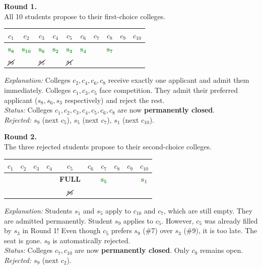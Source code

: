 {\medskip
\noindent\textbf{Round 1.} \\
All 10 students propose to their first-choice colleges.
\begin{center}
\renewcommand{\arraystretch}{1.2}
\begin{tabular}{cccccccccc}
    $c_1$ & $c_2$ & $c_3$ & $c_4$ & $c_5$ & $c_6$ & $c_7$ & $c_8$ & $c_9$ & $c_{10}$ \\
    \hline
    \textcolor{ForestGreen}{$\mathbf{s_8}$} & \textcolor{ForestGreen}{$\mathbf{s_{10}}$} & \textcolor{ForestGreen}{$\mathbf{s_6}$} & \textcolor{ForestGreen}{$\mathbf{s_2}$} & \textcolor{ForestGreen}{$\mathbf{s_3}$} & \textcolor{ForestGreen}{$\mathbf{s_4}$} & & \textcolor{ForestGreen}{$\mathbf{s_7}$} & & \\
    $\cancel{s_9}$ & & $\cancel{s_5}$ & & $\cancel{s_1}$ & & & & & \\
\end{tabular}
\end{center}
\textit{Explanation:} Colleges $c_2, c_4, c_6, c_8$ receive exactly one applicant and admit them immediately. Colleges $c_1, c_3, c_5$ face competition. They admit their preferred applicant ($s_8, s_6, s_3$ respectively) and reject the rest. \\
\textit{Status:} Colleges $c_1, c_2, c_3, c_4, c_5, c_6, c_8$ are now \textbf{permanently closed}. \\
\textit{Rejected:} $s_9$ (next $c_5$), $s_5$ (next $c_7$), $s_1$ (next $c_{10}$).

\medskip
\noindent\textbf{Round 2.} \\
The three rejected students propose to their second-choice colleges. 
\begin{center}
\renewcommand{\arraystretch}{1.2}
\begin{tabular}{cccccccccc}
    \cellcolor{gray!20}$c_1$ & \cellcolor{gray!20}$c_2$ & \cellcolor{gray!20}$c_3$ & \cellcolor{gray!20}$c_4$ & \cellcolor{gray!20}$c_5$ & \cellcolor{gray!20}$c_6$ & $c_7$ & \cellcolor{gray!20}$c_8$ & $c_9$ & $c_{10}$ \\
    \hline
    & & & & \textbf{FULL} & & \textcolor{ForestGreen}{$\mathbf{s_5}$} & & & \textcolor{ForestGreen}{$\mathbf{s_1}$} \\
    & & & & $\cancel{s_9}$ & & & & & \\
\end{tabular}
\end{center}
\textit{Explanation:} Students $s_1$ and $s_5$ apply to $c_{10}$ and $c_7$, which are still empty. They are admitted permanently. Student $s_9$ applies to $c_5$. However, $c_5$ was already filled by $s_3$ in Round 1! Even though $c_5$ prefers $s_9$ (\#7) over $s_3$ (\#9), it is too late. The seat is gone. $s_9$ is automatically rejected. \\
\textit{Status:} Colleges $c_7, c_{10}$ are now \textbf{permanently closed}. Only $c_9$ remains open. \\
\textit{Rejected:} $s_9$ (next $c_2$).

}
